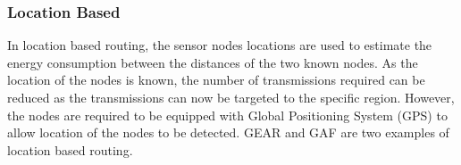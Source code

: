 
\subsubsection{Location Based}
In location based routing, the sensor nodes locations are used to estimate the energy consumption between the distances of the two known nodes. As the location of the nodes is known, the number of transmissions required can be reduced as the transmissions can now be targeted to the specific region. However, the nodes are required to be equipped with Global Positioning System (GPS) to allow location of the nodes to be detected. GEAR \cite{gear} and GAF \cite{gaf} are two examples of location based routing.


